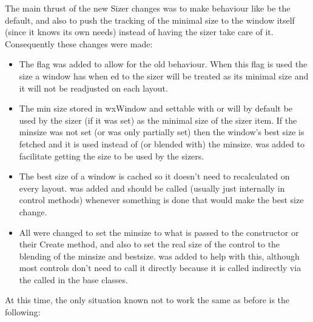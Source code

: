   The main thrust of the new Sizer changes was to make behaviour like
   be the default, and also to push the tracking of
  the minimal size to the window itself (since it knows its own needs)
  instead of having the sizer take care of it.  Consequently these
  changes were made:

\begin{itemize}\itemsep=0pt
\item The  flag was added to allow for the old
      behaviour.  When this flag is used the size a window has when
      ed to the sizer will be treated as its minimal size and it
      will not be readjusted on each layout.

\item The min size stored in wxWindow and settable with  or
       will by default be used by the sizer (if it was set)
      as the minimal size of the sizer item.  If the minsize was not
      set (or was only partially set) then the window's best size is
      fetched and it is used instead of (or blended with) the minsize.
       was added to facilitate getting the
      size to be used by the sizers.

\item The best size of a window is cached so it doesn't need to
      recalculated on every layout.  was
      added and should be called (usually just internally in control
      methods) whenever something is done that would make the best
      size change.

\item All  were changed to set the minsize to what is passed
      to the constructor or their Create method, and also to set the real
      size of the control to the blending of the minsize and bestsize.
       was added to help with this,
      although most controls don't need to call it directly because it
      is called indirectly via the  called in the base
      classes.
\end{itemize}

  At this time, the only situation known not to work the same as
  before is the following:

